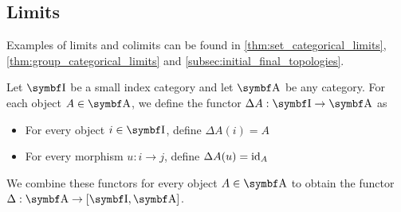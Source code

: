 \subsection{Limits}\label{subsec:categorical_limits}

\begin{note}\label{def:categorical_limit_examples}
  Examples of limits and colimits can be found in \cref{thm:set_categorical_limits}, \cref{thm:group_categorical_limits} and \cref{subsec:initial_final_topologies}.
\end{note}

\begin{definition}\label{def:diagonal_functor}\cite[143]{Leinster2014}
  Let \( \Bold I \) be a small index category and let \( \Bold A \) be any category. For each object \( A \in \Bold A \), we define the functor \( \Delta A: \Bold I \to \Bold A \) as
  \begin{itemize}
    \item For every object \( i \in \Bold I \), define \( \Delta A(i) = A \)
    \item For every morphism \( u: i \to j \), define \( \Delta A(u) = \operatorname{id}_A \)
  \end{itemize}

  We combine these functors for every object \( A \in \Bold A \) to obtain the functor \( \Delta: \Bold A \to [\Bold I, \Bold A] \).
\end{definition}


